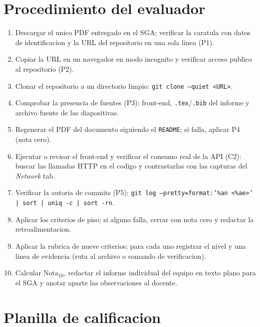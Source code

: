 \documentclass[11pt,a4paper]{article}
\begin{document}
\section{Procedimiento del evaluador}

\begin{enumerate}
	\item Descargar el unico PDF entregado en el SGA; verificar la caratula con datos de identificacion y la URL del repositorio en una sola linea (P1).
	\item Copiar la URL en un navegador en modo incognito y verificar acceso publico al repositorio (P2).
	\item Clonar el repositorio a un directorio limpio: \texttt{git clone --quiet <URL>}.
	\item Comprobar la presencia de fuentes (P3): front-end, \texttt{.tex}/\texttt{.bib} del informe y archivo fuente de las diapositivas.
	\item Regenerar el PDF del documento siguiendo el \texttt{README}; si falla, aplicar P4 (nota cero).
	\item Ejecutar o revisar el front-end y verificar el consumo real de la API (C2): buscar las llamadas HTTP en el codigo y contrastarlas con las capturas del \emph{Network} tab.
	\item Verificar la autoria de commits (P5): \texttt{git log --pretty=format:'\%an <\%ae>' | sort | uniq -c | sort -rn}.
	\item Aplicar los criterios de piso; si alguno falla, cerrar con nota cero y redactar la retroalimentacion.
	\item Aplicar la rubrica de nueve criterios; para cada uno registrar el nivel y una linea de evidencia (ruta al archivo o comando de verificacion).
	\item Calcular $\text{Nota}_{10}$, redactar el informe individual del equipo en texto plano para el SGA y anotar aparte las observaciones al docente.
\end{enumerate}

\section{Planilla de calificacion}
\end{document}
